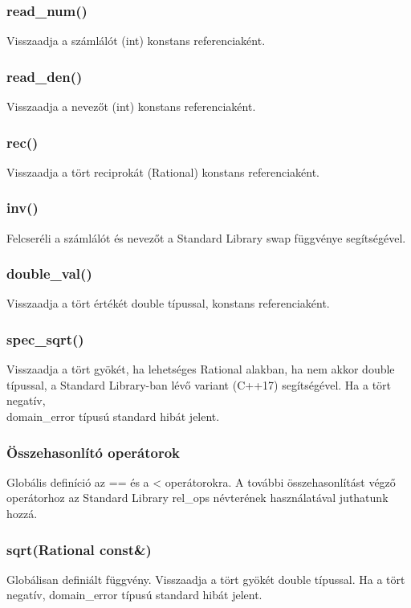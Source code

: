 \documentclass[a4paper, 12pt]{article}
\begin{document}
\subsubsection*{read\_num()}
Visszaadja a számlálót (int) konstans referenciaként.

\subsubsection*{read\_den()}
Visszaadja a nevezőt (int) konstans referenciaként.

\subsubsection*{rec()}
Visszaadja a tört reciprokát (Rational) konstans referenciaként.

\subsubsection*{inv()}
Felcseréli a számlálót és nevezőt a Standard Library swap függvénye segítségével. 

\subsubsection*{double\_val()}
Visszaadja a tört értékét double típussal, konstans referenciaként.

\subsubsection*{spec\_sqrt()}
Visszaadja a tört gyökét, ha lehetséges Rational alakban, ha nem akkor double típussal, a Standard Library-ban lévő variant (C++17)  segítségével. Ha a tört negatív, \\domain\_error típusú standard hibát jelent.

\subsubsection*{Összehasonlító operátorok}
Globális definíció az == és a < operátorokra. A további összehasonlítást végző operátorhoz az Standard Library rel\_ops névterének használatával juthatunk hozzá.

\subsubsection*{sqrt(Rational const\&)}
Globálisan definiált függvény. Visszaadja a tört gyökét double típussal. Ha a tört negatív, domain\_error típusú standard hibát jelent.
\end{document}
